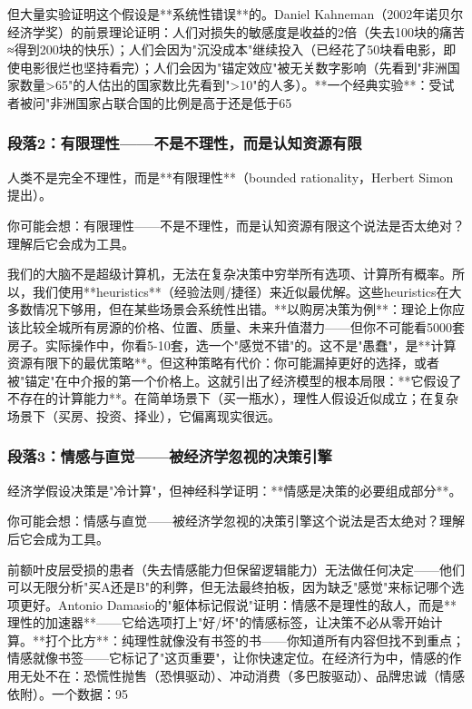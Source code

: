 \documentclass[openany, a4paper, 12pt]{book}
\newenvironment{motivation}{
	\vspace{0.5em}
	\begin{tcolorbox}[
		colback=gray!10,           %
		colframe=gray!60,          %
		title=\textit{本章动机 (Motivation)},
		fonttitle=\bfseries,
		arc=0mm,                   %
		leftrule=3mm               %
		]
		\small \itshape %
	}{
	\end{tcolorbox}
	\vspace{1em}
}
\begin{document}
\begin{motivation}
\begin{motivation}
但大量实验证明这个假设是**系统性错误**的。Daniel Kahneman（2002年诺贝尔经济学奖）的前景理论证明：人们对损失的敏感度是收益的2倍（失去100块的痛苦≈得到200块的快乐）；人们会因为"沉没成本"继续投入（已经花了50块看电影，即使电影很烂也坚持看完）；人们会因为"锚定效应"被无关数字影响（先看到"非洲国家数量>65"的人估出的国家数比先看到">10"的人多）。**一个经典实验**：受试者被问"非洲国家占联合国的比例是高于还是低于65%

	\subsubsection*{段落2：有限理性——不是不理性，而是认知资源有限}
	人类不是完全不理性，而是**有限理性**（bounded rationality，Herbert Simon提出）。
	\begin{tcolorbox}[colback=yellow!5, title=\textit{读者行为预测}]
		你可能会想：有限理性——不是不理性，而是认知资源有限这个说法是否太绝对？理解后它会成为工具。
	\end{tcolorbox}

我们的大脑不是超级计算机，无法在复杂决策中穷举所有选项、计算所有概率。所以，我们使用**heuristics**（经验法则/捷径）来近似最优解。这些heuristics在大多数情况下够用，但在某些场景会系统性出错。**以购房决策为例**：理论上你应该比较全城所有房源的价格、位置、质量、未来升值潜力——但你不可能看5000套房子。实际操作中，你看5-10套，选一个"感觉不错"的。这不是"愚蠢"，是**计算资源有限下的最优策略**。但这种策略有代价：你可能漏掉更好的选择，或者被"锚定"在中介报的第一个价格上。这就引出了经济模型的根本局限：**它假设了不存在的计算能力**。在简单场景下（买一瓶水），理性人假设近似成立；在复杂场景下（买房、投资、择业），它偏离现实很远。

	\subsubsection*{段落3：情感与直觉——被经济学忽视的决策引擎}
	经济学假设决策是"冷计算"，但神经科学证明：**情感是决策的必要组成部分**。
	\begin{tcolorbox}[colback=yellow!5, title=\textit{读者行为预测}]
		你可能会想：情感与直觉——被经济学忽视的决策引擎这个说法是否太绝对？理解后它会成为工具。
	\end{tcolorbox}

前额叶皮层受损的患者（失去情感能力但保留逻辑能力）无法做任何决定——他们可以无限分析"买A还是B"的利弊，但无法最终拍板，因为缺乏"感觉"来标记哪个选项更好。Antonio Damasio的"躯体标记假说"证明：情感不是理性的敌人，而是**理性的加速器**——它给选项打上"好/坏"的情感标签，让决策不必从零开始计算。**打个比方**：纯理性就像没有书签的书——你知道所有内容但找不到重点；情感就像书签——它标记了"这页重要"，让你快速定位。在经济行为中，情感的作用无处不在：恐慌性抛售（恐惧驱动）、冲动消费（多巴胺驱动）、品牌忠诚（情感依附）。一个数据：95%


\end{motivation}
\end{motivation}
\end{document}
